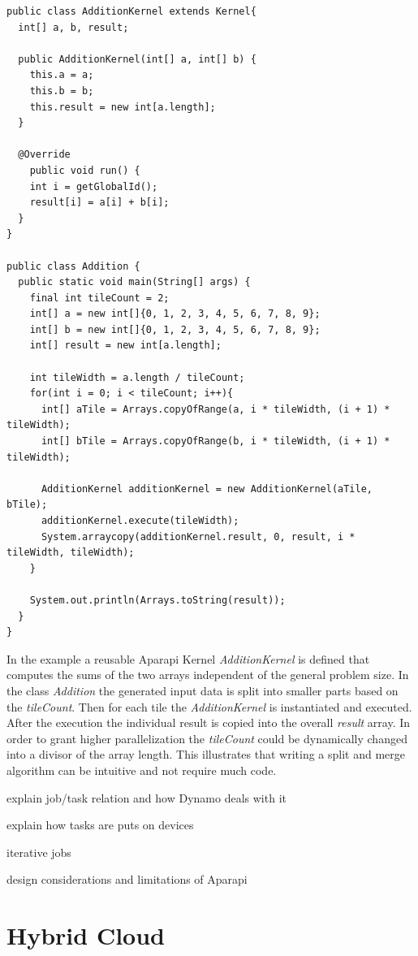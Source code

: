 \begin{lstlisting}
public class AdditionKernel extends Kernel{
  int[] a, b, result;

  public AdditionKernel(int[] a, int[] b) {
    this.a = a;
    this.b = b;
    this.result = new int[a.length];
  }

  @Override
    public void run() {
    int i = getGlobalId();
    result[i] = a[i] + b[i];
  }
}

public class Addition {
  public static void main(String[] args) {
    final int tileCount = 2;
    int[] a = new int[]{0, 1, 2, 3, 4, 5, 6, 7, 8, 9};
    int[] b = new int[]{0, 1, 2, 3, 4, 5, 6, 7, 8, 9};
    int[] result = new int[a.length];

    int tileWidth = a.length / tileCount;
    for(int i = 0; i < tileCount; i++){
      int[] aTile = Arrays.copyOfRange(a, i * tileWidth, (i + 1) * tileWidth);
      int[] bTile = Arrays.copyOfRange(b, i * tileWidth, (i + 1) * tileWidth);

      AdditionKernel additionKernel = new AdditionKernel(aTile, bTile);
      additionKernel.execute(tileWidth);
      System.arraycopy(additionKernel.result, 0, result, i * tileWidth, tileWidth);
    }

    System.out.println(Arrays.toString(result));
  }
}

\end{lstlisting}

In the example a reusable Aparapi Kernel \textit{AdditionKernel} is defined that computes the sums of the two arrays independent of the general problem size. In the class \textit{Addition} the generated input data is split into smaller parts based on the \textit{tileCount}. Then for each tile the \textit{AdditionKernel} is instantiated and executed. After the execution the individual result is copied into the overall \textit{result} array. In order to grant higher parallelization the \textit{tileCount} could be dynamically changed into a divisor of the array length. This illustrates that writing a split and merge algorithm can be intuitive and not require much code.

explain job/task relation and how Dynamo deals with it

explain how tasks are puts on devices

iterative jobs

design considerations and limitations of Aparapi

\section{Hybrid Cloud}


